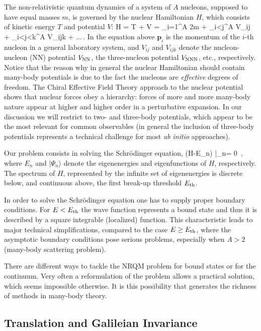 The non-relativistic quantum dynamics of a system of $A$ nucleons, supposed to have equal masses $m$,
is governed by the nuclear Hamiltonian $H$, 
which consists of kinetic energy $T$ and potential $V$:
\be
H = T + V  = \sum_{i=1}^A { {2m} } + \sum_{i<j}^A V_{ij} + \sum_{i<j<k}^A V_{ijk} + ...\,.
\label{Hint}
\ee
In the equation above $\mathbf{p}_i$ is the momentum of the $i$-th nucleon in a general laboratory system,  
and $V_{ij}$ and $V_{ijk}$ denote the nucleon-nucleon (NN)
potential $V_{\rm NN}$, the three-nucleon potential $V_{\rm NNN}$, etc., respectively.
Notice that the reason why in general the nuclear Hamiltonian should contain many-body potentials is due to the fact 
the nucleons are {\it effective} degrees of freedom. The Chiral Effective Field Theory approach to the nuclear potential~\cite{EpM11}
 shows that nuclear forces obey a hierarchy: forces of
more and more many-body nature appear at higher and higher order in a perturbative expansion. 
In our discussion we will restrict to two- and three-body potentials, which appear to be the most relevant for common observables (in
general the inclusion of three-body potentials represents a technical challenge for most {\it ab initio} approaches).

Our problem consists in solving the Schr\"odinger equation,
\be
(H-E_n) |\Psi_n\rangle = 0 \,,
\ee
where $E_n$ and $|\Psi_n\rangle$ denote the eigenenergies and eigenfunctions of $H$, respectively.
The spectrum of $H$, represented by the infinite set of eigenenergies is discrete below, and continuous above, 
the first break-up threshold $E_{\rm th}$. 


In order to solve the Schr\"odinger equation  one has to supply proper
boundary conditions.  For $E < E_{\rm th}$ the wave function represents a bound state
and thus it is described by a square integrable (localized) function. This characteristic 
leads to major technical simplifications, compared
to the case  $E \ge E_{\rm th}$, where  the asymptotic boundary conditions pose   serious problems, especially when  $A>2$ 
(many-body scattering problem). 

There are different ways to tackle the NRQM problem for bound states or for the continuum. 
Very often a reformulation of the problem allows a practical solution, 
which seems impossible otherwise. It is this possibility that generates the richness of methods in many-body theory.



\subsection{Translation and Galileian Invariance}\label{sec:TGI}

